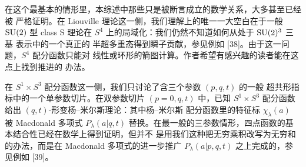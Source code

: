 在这个最基本的情形里，本综述中那些只是被断言成立的数学关系，大多甚至已经被
严格证明。在 Liouville 理论这一侧，我们理解上的唯一一大空白在于一般 $\mathrm{SU}(2)$
型 class S 理论在 $S^4$ 上的局域化：我们仍然不知道如何从处于 $\mathrm{SU}(2)^3$ 三基
表示中的一个真正的%
半超多重态得到瞬子贡献，参见例如 [38]。由于这一问题，$S^4$ 配分函数只能对
线性或环形的箭图计算。作者希望有感兴趣的读者能在这点上找到推进的
办法。


在 $S^1\times S^3$ 配分函数这一侧，我们只讨论了含三个参数 $(p,q,t)$ 的一般
超共形指标中的一个单参数切片。在双参数切片 $(p=0,q,t)$ 中，已知
$S^1\times S^3$ 配分函数给出 $(q,t)$-形变杨--米尔斯理论：其中杨--米尔斯
配分函数里的特征标 $\chi_\lambda(a)$ 被 Macdonald 多项式 $P_\lambda(a|q,t)$
替换。在最一般的三参数情形，四点函数的基本结合性已经在数学上得到证明，但并不
是用我们这种把无穷乘积改写为无穷和的办法，而是在 Macdonald 多项式的进一步推广
$P_\lambda(a|p,q,t)$ 之上完成的，参见例如 [39]。


